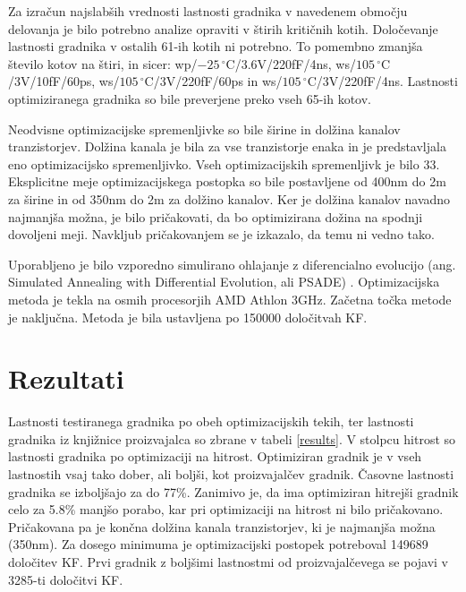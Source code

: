 \documentclass[journal,a4paper,twoside]{sty/IEEEtran}
\begin{document}
Za izračun najslabših vrednosti lastnosti gradnika v navedenem območju delovanja je bilo potrebno analize opraviti v štirih kritičnih kotih. Določevanje lastnosti gradnika v ostalih 61-ih kotih ni potrebno. To pomembno zmanjša število kotov na štiri, in sicer: wp/$-25\,^{\circ}\mathrm{C}$/3.6V/220fF/4ns, ws/$105\,^{\circ}\mathrm{C}$/3V/10fF/60ps, ws/$105\,^{\circ}\mathrm{C}$/3V/220fF/60ps in ws/$105\,^{\circ}\mathrm{C}$/3V/220fF/4ns. Lastnosti optimiziranega gradnika so bile preverjene preko vseh 65-ih kotov.

Neodvisne optimizacijske spremenljivke so bile širine in dolžina kanalov tranzistorjev. Dolžina kanala je bila za vse tranzistorje enaka in je predstavljala eno optimizacijsko spremenljivko. Vseh optimizacijskih spremenljivk je bilo 33. Eksplicitne meje optimizacijskega postopka so bile postavljene od 400nm do 2\textmu m za širine in od 350nm do 2\textmu m za dolžino kanalov. Ker je dolžina kanalov navadno najmanjša možna, je bilo pričakovati, da bo optimizirana dožina na spodnji dovoljeni meji. Navkljub pričakovanjem se je izkazalo, da temu ni vedno tako.

Uporabljeno je bilo vzporedno simulirano ohlajanje z diferencialno evolucijo (ang. Simulated Annealing with Differential Evolution, ali PSADE) \cite{olensek}. Optimizacijska metoda je tekla na osmih procesorjih AMD Athlon 3GHz. Začetna točka metode je naključna. Metoda je bila ustavljena po 150000 določitvah KF.

\section{Rezultati}
Lastnosti testiranega gradnika po obeh optimizacijskih tekih, ter lastnosti gradnika iz knjižnice proizvajalca so zbrane v tabeli \ref{results}. V stolpcu hitrost so lastnosti gradnika po optimizaciji na hitrost. Optimiziran gradnik je v vseh lastnostih vsaj tako dober, ali boljši, kot proizvajalčev gradnik. Časovne lastnosti gradnika se izboljšajo za do 77\%. Zanimivo je, da ima optimiziran hitrejši gradnik celo za 5.8\% manjšo porabo, kar pri optimizaciji na hitrost ni bilo pričakovano. Pričakovana pa je končna dolžina kanala tranzistorjev, ki je najmanjša možna (350nm). Za dosego minimuma je optimizacijski postopek potreboval 149689 določitev KF. Prvi gradnik z boljšimi lastnostmi od proizvajalčevega se pojavi v 3285-ti določitvi KF.
\end{document}
